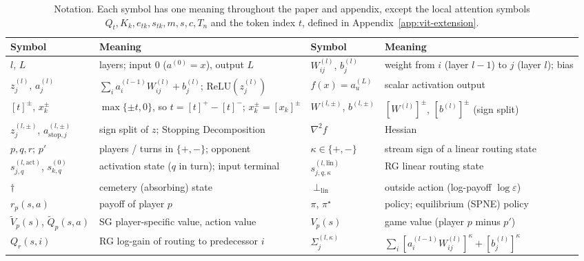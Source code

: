 \documentclass[twoside]{article}
\newcommand{\relu}{\text{ReLU}}
\newcommand{\1}{\mathbf{1}}
\begin{document}
\begin{table}[H]
    \centering
    \footnotesize
    \caption{Notation. Each symbol has one meaning throughout the paper and appendix, except the local
    attention symbols $Q_t, K_k, e_{tk}, s_{tk}, m, s, c, T_n$ and the token index $t$, defined in
    Appendix~\ref{app:vit-extension}.}\label{tab:notation}
    \setlength{\tabcolsep}{4pt}
    \renewcommand{\arraystretch}{1.12}
    \begin{tabularx}{\textwidth}{@{}l X l X@{}}
        \toprule
        \textbf{Symbol} & \textbf{Meaning} & \textbf{Symbol} & \textbf{Meaning} \\
        \midrule
        $l$, $L$ & layers; input $0$ ($a^{(0)} = x$), output $L$ & $W^{(l)}_{ij}$, $b^{(l)}_j$ & weight
        from $i$ (layer $l{-}1$) to $j$ (layer $l$); bias \\
        $z^{(l)}_j$, $a^{(l)}_j$ & $\sum_i a^{(l-1)}_i W^{(l)}_{ij} + b^{(l)}_j$; $\relu(z^{(l)}_j)$ &
        $f(x) = a^{(L)}_u$ & scalar activation output \\
        $[t]^\pm$, $x_k^\pm$ & $\max\{\pm t, 0\}$, so $t = [t]^+ - [t]^-$; $x_k^\pm = [x_k]^\pm$ &
        $W^{(l,\pm)}$, $b^{(l,\pm)}$ & $[W^{(l)}]^\pm$, $[b^{(l)}]^\pm$ (sign split) \\
        $z^{(l,\pm)}_j$, $a^{(l,\pm)}_{\mathrm{stop},j}$ & sign split of $z$; Stopping Decomposition &
        $\nabla^2 f$ & Hessian \\
        \midrule
        $p, q, r$; $p'$ & players / turns in $\{+,-\}$; opponent & $\kappa \in \{+,-\}$ & stream sign of a
        linear routing state \\
        $s^{(l,\mathrm{act})}_{j,q}$, $s^{(0)}_{k,q}$ & activation state ($q$ in turn); input terminal &
        $s^{(l,\mathrm{lin})}_{j,q,\kappa}$ & \ac{RG} linear routing state \\
        $\dagger$ & cemetery (absorbing) state & $\perp_{\mathrm{lin}}$ & outside action (log-payoff
        $\log\varepsilon$) \\
        $r_p(s,a)$ & payoff of player $p$ & $\pi$, $\pi^\star$ & policy; equilibrium (SPNE) policy \\
        $\tilde V_p(s)$, $\tilde Q_p(s,a)$ & \ac{SG} player-specific value, action value & $V_p(s)$ & game
        value (player $p$ minus $p'$) \\
        $Q_r(s,i)$ & \ac{RG} log-gain of routing to predecessor $i$ & $\Sigma^{(l,\kappa)}_j$ & $\sum_i
            [a^{(l-1)}_i W^{(l)}_{ij}]^\kappa + [b^{(l)}_j]^\kappa$ \\

\end{tabularx}
\end{table}
\end{document}
